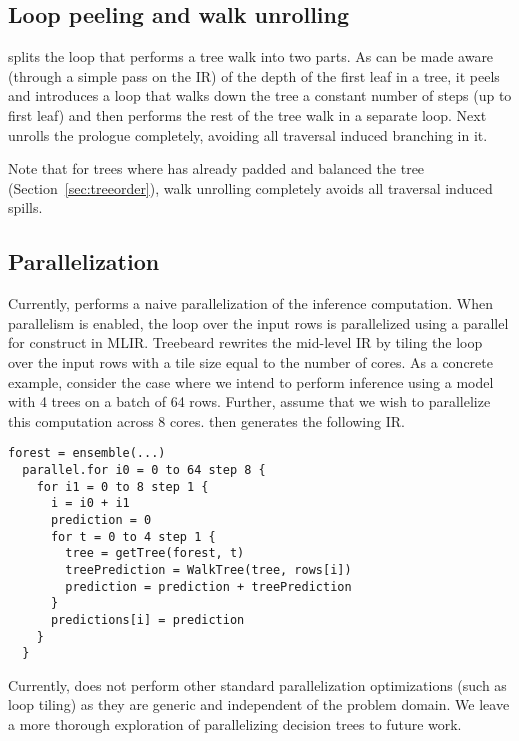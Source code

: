 \subsection{Loop peeling and walk unrolling}
\Treebeard{} splits the loop that performs a tree walk into two parts. As can be made aware (through a simple pass on the IR) of the depth of the first leaf in a tree, it peels and introduces a  loop that walks down the tree a constant number of steps (up to first leaf) and then performs the rest of the tree walk in a separate loop. Next \Treebeard{} unrolls the prologue completely, avoiding all traversal induced branching in it.

Note that for trees where \Treebeard{} has already padded and balanced the tree (Section~\ref{sec:treeorder}), walk unrolling completely avoids all traversal induced spills.


\subsection{Parallelization}
Currently, \Treebeard{} performs a naive parallelization of the inference computation. When parallelism is enabled, the 
loop over the input rows is parallelized using a parallel for construct in MLIR. Treebeard rewrites 
the mid-level IR by tiling the loop over the input rows with a tile size equal to the number of cores. 
As a concrete example, consider the case where we intend to perform inference using a model with 4 trees 
on a batch of 64 rows. Further, assume that we wish to parallelize this computation across 8 cores. 
\Treebeard{} then generates the following IR.
\begin{lstlisting}[style=c++]
  forest = ensemble(...)
  parallel.for i0 = 0 to 64 step 8 {
    for i1 = 0 to 8 step 1 {
      i = i0 + i1
      prediction = 0
      for t = 0 to 4 step 1 {
        tree = getTree(forest, t) 
        treePrediction = WalkTree(tree, rows[i])
        prediction = prediction + treePrediction
      }
      predictions[i] = prediction
    }
  }
\end{lstlisting}
Currently, \Treebeard{} does not perform other standard parallelization optimizations  (such as loop tiling) as they
are generic and independent of the problem domain. We leave a more thorough exploration of parallelizing decision trees
to future work.